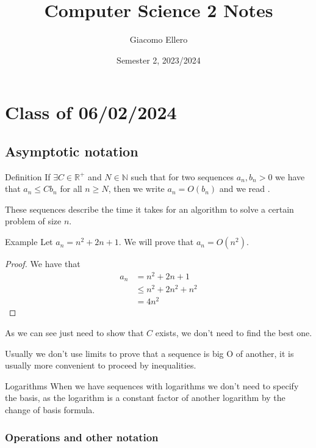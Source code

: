 \documentclass[10pt]{extarticle}
\title{Computer Science 2 Notes}
\author{Giacomo Ellero}
\date{Semester 2, 2023/2024}
\newcommand{\R}{\mathbb{R}}
\newcommand{\N}{\mathbb{N}}
\begin{document}
\maketitle
\tableofcontents
\clearpage

\section{Class of 06/02/2024}

\subsection{Asymptotic notation}

\begin{bluebox}{Definition}
    If $\exists C \in \R^+$ and $N \in \N$ such that for two sequences $a_n, b_n > 0$
    we have that $a_n \leq Cb_n$ for all $n \geq N$, then we write $a_n = O(b_n)$ and we read .
\end{bluebox}

These sequences describe the time it takes for an algorithm to solve a certain problem of size $n$.

\begin{examplebox}{Example}
    Let $a_n = n^2 + 2n + 1$. We will prove that $a_n = O(n^2)$.

    \begin{proof}
        We have that
        \begin{align*}
            a_n & = n^2 + 2n + 1        \\
                & \leq n^2 + 2n^2 + n^2 \\
                & = 4n^2
        \end{align*}
    \end{proof}

    As we can see just need to show that $C$ exists, we don't need to find the best one.
\end{examplebox}

Usually we don't use limits to prove that a sequence is big O of another, it is usually more convenient to proceed by inequalities.

\begin{notebox}{Logarithms}
    When we have sequences with logarithms we don't need to specify the basis,
    as the logarithm is a constant factor of another logarithm by the change of basis formula.
\end{notebox}

\subsubsection{Operations and other notation}
\end{document}
